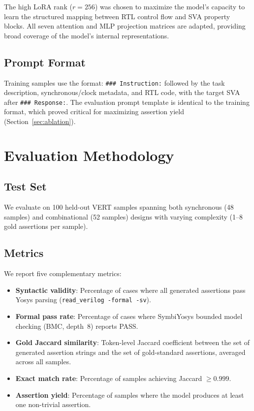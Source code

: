 \documentclass[conference]{IEEEtran}
\begin{document}
The high LoRA rank ($r=256$) was chosen to maximize the model's capacity to learn the structured mapping between RTL control flow and SVA property blocks. All seven attention and MLP projection matrices are adapted, providing broad coverage of the model's internal representations.

\subsection{Prompt Format}
Training samples use the format: \texttt{\#\#\# Instruction:} followed by the task description, synchronous/clock metadata, and RTL code, with the target SVA after \texttt{\#\#\# Response:}. The evaluation prompt template is identical to the training format, which proved critical for maximizing assertion yield (Section~\ref{sec:ablation}).

\section{Evaluation Methodology}
\label{sec:eval}

\subsection{Test Set}
We evaluate on 100 held-out VERT samples spanning both synchronous (48 samples) and combinational (52 samples) designs with varying complexity (1--8 gold assertions per sample).

\subsection{Metrics}
We report five complementary metrics:

\begin{itemize}
    \item \textbf{Syntactic validity}: Percentage of cases where all generated assertions pass Yosys parsing (\texttt{read\_verilog -formal -sv}).
    \item \textbf{Formal pass rate}: Percentage of cases where SymbiYosys bounded model checking (BMC, depth~8) reports PASS.
    \item \textbf{Gold Jaccard similarity}: Token-level Jaccard coefficient between the set of generated assertion strings and the set of gold-standard assertions, averaged across all samples.
    \item \textbf{Exact match rate}: Percentage of samples achieving Jaccard $\geq 0.999$.
    \item \textbf{Assertion yield}: Percentage of samples where the model produces at least one non-trivial assertion.
\end{itemize}
\end{document}
